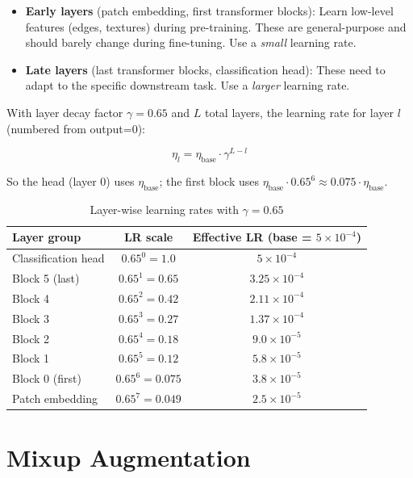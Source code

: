 \documentclass[12pt, a4paper]{report}
\begin{document}
\begin{itemize}
    \item \textbf{Early layers} (patch embedding, first transformer blocks): Learn low-level features (edges, textures) during pre-training. These are general-purpose and should barely change during fine-tuning. Use a \emph{small} learning rate.
    \item \textbf{Late layers} (last transformer blocks, classification head): These need to adapt to the specific downstream task. Use a \emph{larger} learning rate.
\end{itemize}

With layer decay factor $\gamma = 0.65$ and $L$ total layers, the learning rate for layer $l$ (numbered from output=0):

\begin{equation}
\eta_l = \eta_{\text{base}} \cdot \gamma^{L - l}
\end{equation}

So the head (layer 0) uses $\eta_{\text{base}}$; the first block uses $\eta_{\text{base}} \cdot 0.65^6 \approx 0.075 \cdot \eta_{\text{base}}$.

\begin{table}[H]
\centering
\begin{tabular}{lcc}
\toprule
\textbf{Layer group} & \textbf{LR scale} & \textbf{Effective LR} (base = $5 \times 10^{-4}$) \\
\midrule
Classification head & $0.65^0 = 1.0$ & $5 \times 10^{-4}$ \\
Block 5 (last) & $0.65^1 = 0.65$ & $3.25 \times 10^{-4}$ \\
Block 4 & $0.65^2 = 0.42$ & $2.11 \times 10^{-4}$ \\
Block 3 & $0.65^3 = 0.27$ & $1.37 \times 10^{-4}$ \\
Block 2 & $0.65^4 = 0.18$ & $9.0 \times 10^{-5}$ \\
Block 1 & $0.65^5 = 0.12$ & $5.8 \times 10^{-5}$ \\
Block 0 (first) & $0.65^6 = 0.075$ & $3.8 \times 10^{-5}$ \\
Patch embedding & $0.65^7 = 0.049$ & $2.5 \times 10^{-5}$ \\
\bottomrule
\end{tabular}
\caption{Layer-wise learning rates with $\gamma = 0.65$}
\end{table}

\section{Mixup Augmentation}
\end{document}
